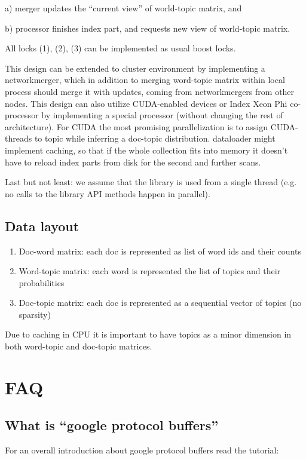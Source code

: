 \documentclass[11pt,a4paper,twoside]{report}
\begin{document}
a) merger updates the “current view” of world-topic matrix, and

b) processor finishes index part, and requests new view of world-topic matrix.

All locks (1), (2), (3) can be implemented as usual boost locks.

This design can be extended to cluster environment by implementing a networkmerger,
which in addition to merging word-topic matrix within local process should merge it with updates,
coming from networkmergers from other nodes.
This design can also utilize CUDA-enabled devices or Index Xeon Phi co-processor
by implementing a special processor (without changing the rest of architecture).
For CUDA the most promising parallelization is to assign CUDA-threads to topic
while inferring a doc-topic distribution.
dataloader might implement caching, so that if the whole collection fits into memory
it doesn’t have to reload index parts from disk for the second and further scans.

Last but not least:
we assume that the library is used from a single thread
(e.g. no calls to the library API methods happen in parallel).

\subsection{Data layout}
\begin{enumerate}
    \item Doc-word matrix: each doc is represented as list of word ids and their counts
    \item Word-topic matrix: each word is represented the list of topics and their probabilities
    \item Doc-topic matrix: each doc is represented as a sequential vector of topics (no sparsity)
\end{enumerate}

Due to caching in CPU it is important to have topics as a minor dimension in both word-topic and doc-topic matrices.

\section{FAQ}

\subsection{What is ``google protocol buffers''}

For an overall introduction about google protocol buffers read the tutorial:
\end{document}
